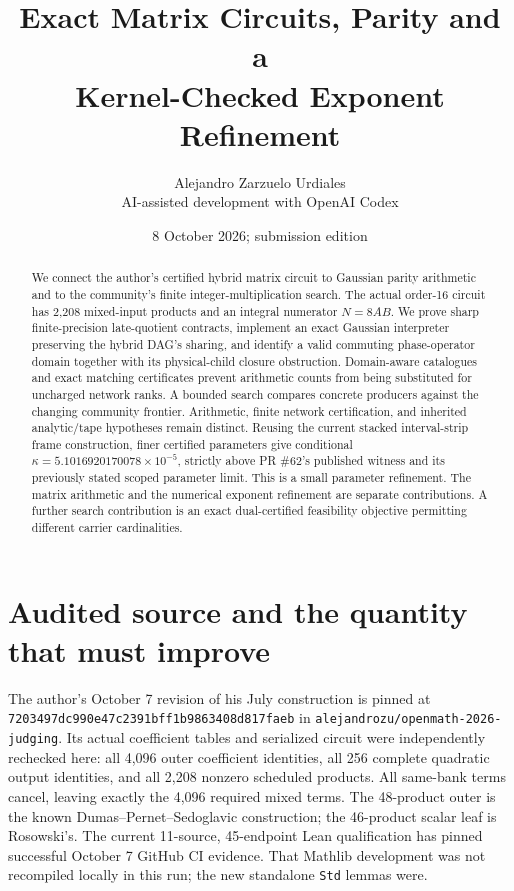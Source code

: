 \documentclass[11pt]{article}
\title{Exact Matrix Circuits, Parity and a\\Kernel-Checked Exponent Refinement}
\author{Alejandro Zarzuelo Urdiales\\\small AI-assisted development with OpenAI Codex}
\date{8 October 2026; submission edition}
\begin{document}
\maketitle
\begin{abstract}
We connect the author's certified hybrid matrix circuit to Gaussian parity
arithmetic and to the community's finite integer-multiplication search.
The actual order-16 circuit has 2,208 mixed-input products and an integral
numerator $N=8AB$. We prove sharp finite-precision late-quotient contracts,
implement an exact Gaussian interpreter preserving the hybrid DAG's sharing,
and identify a valid commuting phase-operator domain together with its
physical-child closure obstruction. Domain-aware catalogues and exact
matching certificates prevent arithmetic counts from being substituted for
uncharged network ranks. A bounded search compares concrete producers against
the changing community frontier. Arithmetic, finite network certification,
and inherited analytic/tape hypotheses remain distinct. Reusing the current
stacked interval-strip frame construction, finer certified parameters give conditional
$\kappa=5.1016920170078\times10^{-5}$, strictly above PR \#62's published
witness and its previously stated scoped parameter limit. This is a small
parameter refinement. The matrix arithmetic and the numerical exponent
refinement are separate contributions. A further search contribution is an
exact dual-certified feasibility objective permitting different carrier
cardinalities.
\end{abstract}

\section{Audited source and the quantity that must improve}
The author's October 7 revision of his July construction is pinned at
\texttt{7203497dc990e47c2391bff1b9863408d817faeb} in
\texttt{alejandrozu/openmath-2026-judging}. Its actual coefficient tables and
serialized circuit were independently rechecked here: all 4,096 outer
coefficient identities, all 256 complete quadratic output identities, and
all 2,208 nonzero scheduled products. All same-bank terms cancel, leaving
exactly the 4,096 required mixed terms. The 48-product outer is the known
Dumas--Pernet--Sedoglavic construction; the 46-product scalar leaf is Rosowski's.
The current 11-source, 45-endpoint Lean qualification has pinned successful
October 7 GitHub CI evidence. That Mathlib development was not recompiled
locally in this run; the new standalone \texttt{Std} lemmas were.
\end{document}
